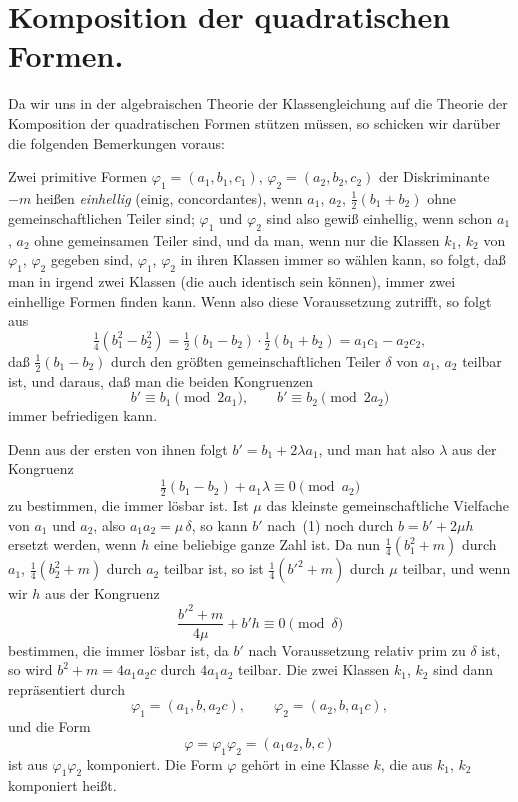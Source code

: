 \documentclass[12pt,a4paper]{article}
\theoremstyle{weber}
\begin{document}
\newpage
\section{Komposition der quadratischen Formen.}

Da wir uns in der algebraischen Theorie der Klassengleichung auf die Theorie der Komposition der quadratischen Formen stützen müssen, so schicken wir darüber die folgenden Bemerkungen voraus:

Zwei primitive Formen $\varphi_1 = (a_1, b_1, c_1)$, $\varphi_2 = (a_2, b_2, c_2)$ der Diskriminante $-m$ heißen \textit{einhellig} (einig, concordantes), wenn $a_1$, $a_2$, $\frac{1}{2}(b_1 + b_2)$ ohne gemeinschaftlichen Teiler sind; $\varphi_1$ und $\varphi_2$ sind also gewiß einhellig, wenn schon $a_1$, $a_2$ ohne gemeinsamen Teiler sind, und da man, wenn nur die Klassen $k_1$, $k_2$ von $\varphi_1$, $\varphi_2$ gegeben sind, $\varphi_1$, $\varphi_2$ in ihren Klassen immer so wählen kann, so folgt, daß man in irgend zwei Klassen (die auch identisch sein können), immer zwei einhellige Formen finden kann. Wenn also diese Voraussetzung zutrifft, so folgt aus
\[
\tfrac{1}{4}(b_1^2 - b_2^2) = \tfrac{1}{2}(b_1 - b_2) \cdot \tfrac{1}{2}(b_1 + b_2) = a_1 c_1 - a_2 c_2,
\]
daß $\frac{1}{2}(b_1 - b_2)$ durch den größten gemeinschaftlichen Teiler $\delta$ von $a_1$, $a_2$ teilbar ist, und daraus, daß man die beiden Kongruenzen
\begin{equation}
b' \equiv b_1 \pmod{2a_1}, \qquad b' \equiv b_2 \pmod{2a_2}
\end{equation}
immer befriedigen kann.

Denn aus der ersten von ihnen folgt $b' = b_1 + 2\lambda a_1$, und man hat also $\lambda$ aus der Kongruenz
\[
\tfrac{1}{2}(b_1 - b_2) + a_1 \lambda \equiv 0 \pmod{a_2}
\]
zu bestimmen, die immer lösbar ist. Ist $\mu$ das kleinste gemeinschaftliche Vielfache von $a_1$ und $a_2$, also $a_1 a_2 = \mu\,\delta$, so kann $b'$ nach~(1) noch durch $b = b' + 2\mu h$ ersetzt werden, wenn $h$ eine beliebige ganze Zahl ist. Da nun $\frac{1}{4}(b_1^2 + m)$ durch $a_1$, $\frac{1}{4}(b_2^2 + m)$ durch $a_2$ teilbar ist, so ist $\frac{1}{4}(b'^2 + m)$ durch $\mu$ teilbar, und wenn wir $h$ aus der Kongruenz
\[
\frac{b'^2 + m}{4\mu} + b' h \equiv 0 \pmod{\delta}
\]
bestimmen, die immer lösbar ist, da $b'$ nach Voraussetzung relativ prim zu $\delta$ ist, so wird $b^2 + m = 4a_1 a_2 c$ durch $4a_1 a_2$ teilbar. Die zwei Klassen $k_1$, $k_2$ sind dann repräsentiert durch
\[
\varphi_1 = (a_1, b, a_2 c), \qquad \varphi_2 = (a_2, b, a_1 c),
\]
und die Form
\[
\varphi = \varphi_1 \varphi_2 = (a_1 a_2, b, c)
\]
ist aus $\varphi_1 \varphi_2$ komponiert. Die Form $\varphi$ gehört in eine Klasse $k$, die aus $k_1$, $k_2$ komponiert heißt.
\end{document}
